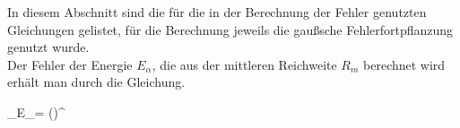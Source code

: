 In diesem Abschnitt sind die für die in der Berechnung der Fehler
genutzten Gleichungen gelistet, für die Berechnung jeweils die 
gaußsche Fehlerfortpflanzung genutzt wurde.\\

Der Fehler der Energie $E_{\alpha}$, die aus der mittleren Reichweite $R_{m}$ 
berechnet wird erhält man durch die Gleichung.
\begin{errorEquation}
	\sigma_{E_{\alpha}}=  \big(\big)^{}
	\label{std:Energie}
\end{errorEquation}

\vspace{20cm}   